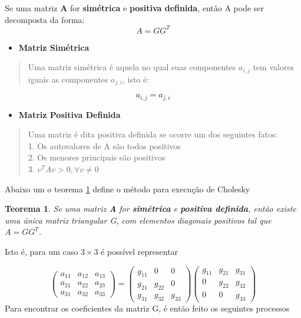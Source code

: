 \documentclass[
]{book}
\providecommand{\tightlist}{%
  \setlength{\itemsep}{0pt}\setlength{\parskip}{0pt}}
\newtheorem{theorem}{Teorema}
\begin{document}
Se uma matriz \textbf{A} for \textbf{simétrica} e \textbf{positiva definida}, então A pode ser decomposta da forma:
\[A = GG^T\]

\begin{itemize}
\tightlist
\item
  \textbf{Matriz Simétrica}
\end{itemize}

\begin{quote}
Uma matriz simétrica é aquela no qual suas componentes \(a_{i,j}\) tem valores iguais as componentes \(a_{j,i}\), isto é:
\end{quote}

\[a_{i,j} = a_{j,i}\]

\begin{itemize}
\tightlist
\item
  \textbf{Matriz Positiva Definida}
\end{itemize}

\begin{quote}
Uma matriz é dita positiva definida se ocorre um dos seguintes fatos:\\
1. Os autovalores de A são todos positivos\\
2. Os menores principais são positivos\\
3. \(v^TAv > 0, \forall v \neq 0\)
\end{quote}

Abaixo um o teorema \ref{thm:cho} define o método para execução de Cholesky

\begin{theorem}
\protect\hypertarget{thm:cho}{}\label{thm:cho}Se uma matriz \textbf{A} for \textbf{simétrica} e \textbf{positiva definida}, então \emph{existe uma única} matriz triangular G, com elementos diagonais positivos tal que \(A = GG^T\).
\end{theorem}

Isto é, para um caso \(3 \times 3\) é possível representar

\[\begin{pmatrix} 
a_{11} & a_{12} & a_{13} \\
a_{21} & a_{22} & a_{23} \\
a_{31} & a_{32} & a_{33} 
\end{pmatrix} = 
\begin{pmatrix}
g_{11} & 0 & 0 \\
g_{21} & g_{22} & 0 \\
g_{31} & g_{32} & g_{33} 
\end{pmatrix}
\begin{pmatrix}
g_{11} & g_{21} & g_{31} \\
0 & g_{22} & g_{32} \\
0 & 0 & g_{33} 
\end{pmatrix}
\]
Para encontrar os coeficientes da matriz G, é então feito os seguintes processos
\end{document}
